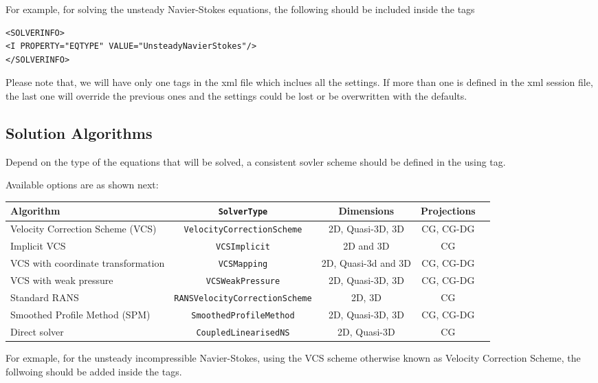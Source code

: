 For example, for solving the unsteady Navier-Stokes equations, the following 
should be included inside the  tags

\begin{lstlisting}[style=XMLStyle]
<SOLVERINFO>
<I PROPERTY="EQTYPE" VALUE="UnsteadyNavierStokes"/>
</SOLVERINFO>
\end{lstlisting}

Please note that, we will have only one  tags in the xml file
which inclues all the settings. If more than one  is defined
in the xml session file, the last one will override the previous ones and the
settings could be lost or be overwritten with the defaults.


\subsection{Solution Algorithms}
Depend on the type of the equations that will be solved, a consistent sovler 
scheme should be defined in the  using  tag.

Available options are as shown next:
\begin{center}
\footnotesize
\begin{tabular}{lcccc}
\toprule
{Algorithm} & {\texttt{SolverType}} &{Dimensions}&{Projections} \\
\midrule
Velocity Correction Scheme (VCS) & \texttt{VelocityCorrectionScheme} & 2D, Quasi-3D, 3D & CG, CG-DG\\
Implicit VCS & \texttt{VCSImplicit} & 2D and 3D & CG\\
VCS with coordinate transformation & \texttt{VCSMapping} & 2D, Quasi-3d and 3D & CG, CG-DG\\
VCS with weak pressure & \texttt{VCSWeakPressure} & 2D, Quasi-3D, 3D & CG, CG-DG\\
Standard RANS & \texttt{RANSVelocityCorrectionScheme} & 2D, 3D & CG\\
Smoothed Profile Method (SPM)    & \texttt{SmoothedProfileMethod}    & 2D, Quasi-3D, 3D & CG, CG-DG\\
Direct solver & \texttt{CoupledLinearisedNS} & 2D, Quasi-3D &CG\\
\bottomrule
\end{tabular}
\end{center}

For exmaple, for the unsteady incompressible Navier-Stokes, using the VCS scheme
otherwise known as Velocity Correction Scheme, the follwoing should be added 
inside the  tags.

